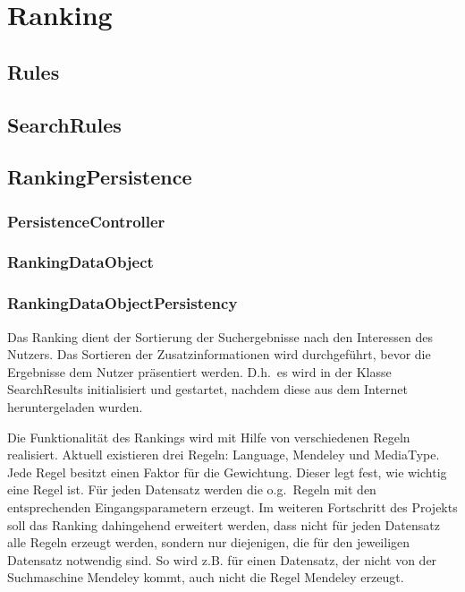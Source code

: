 
\section{Ranking}
\subsection{Rules}
\subsection{SearchRules}
\subsection{RankingPersistence}
\subsubsection{PersistenceController}
\subsubsection{RankingDataObject}
\subsubsection{RankingDataObjectPersistency}

Das Ranking dient der Sortierung der Suchergebnisse nach den Interessen des Nutzers. Das Sortieren der Zusatzinformationen wird durchgeführt, bevor die Ergebnisse dem Nutzer präsentiert werden. D.h.\ es wird in der Klasse \glqq SearchResults\grqq\xspace initialisiert und gestartet, nachdem diese aus dem Internet heruntergeladen wurden.

Die Funktionalität des Rankings wird mit Hilfe von verschiedenen Regeln realisiert. Aktuell existieren drei Regeln: \glqq Language\grqq\xspace, \glqq Mendeley\grqq\xspace und \glqq MediaType\grqq\xspace. Jede Regel besitzt einen Faktor für die Gewichtung. Dieser legt fest, wie wichtig eine Regel ist. Für jeden Datensatz werden die o.g.\ Regeln mit den entsprechenden Eingangsparametern erzeugt. Im weiteren Fortschritt des Projekts soll das Ranking dahingehend erweitert werden, dass nicht für jeden Datensatz alle Regeln erzeugt werden, sondern nur diejenigen, die für den jeweiligen Datensatz notwendig sind. So wird z.B. für einen Datensatz, der nicht von der Suchmaschine Mendeley kommt, auch nicht die Regel \glqq Mendeley\grqq\xspace erzeugt. 

